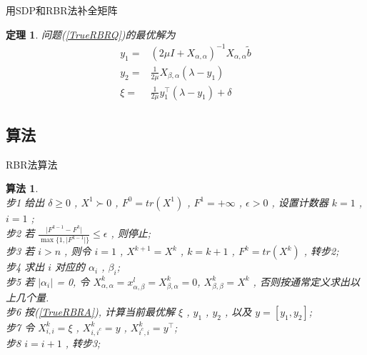 \documentclass[slidestop,compress,mathserif,UTF8]{beamer}
\newtheorem{theo}{\bf \textcolor[rgb]{0.8,0,0}{定理}}[section]  %
\newtheorem{algo}{\bf \textcolor[rgb]{0.8,0,0}{算法}}
\numberwithin{equation}{section}                                %
\begin{document}
            \begin{frame}[t]{用SDP和RBR法补全矩阵}
                \begin{theo}
                    问题(\ref{TrueRBRQ})的最优解为
                    \begin{equation}
                        \begin{split}\label{TrueRBRA}
                            y_1 = & (2 \mu I + X_{\alpha, \alpha})^{-1} X_{\alpha, \alpha}\tilde{b}\\
                            y_2 = & \frac{1}{2 \mu} X_{\beta, \alpha} (\lambda - y_1)\\
                            \xi = & \frac{1}{2 \mu} y_1^\top (\lambda - y_1) + \delta
                        \end{split}
                    \end{equation}
                \end{theo}
            \end{frame}
        \subsection{算法}
            \begin{frame}[t]{RBR法算法}
                \begin{algo}
                    \small\quad\\
                    步1 \quad 给出 $\delta \ge 0$ , $X^1 \succ 0$ , $F^0 = tr(X^1)$ , $F^1 = + \infty$ , $\epsilon > 0$ , 设置计数器 $k = 1$ , $i = 1$ ;\\
                    步2 \quad 若 $\frac{\lvert{F^{k - 1}-F^k}\rvert}{\max\{1,\lvert{F^{k - 1}}\rvert\}}\leq\epsilon$ , 则停止;\\
                    步3 \quad 若 $i>n$ , 则令 $i=1$ , $X^{k + 1}=X^k$ , $k=k + 1$ , $F^k = tr(X^k)$ , 转步2;\\
                    步4 \quad 求出 $i$ 对应的 $\alpha_i$ , $\beta_i$;\\
                    步5 \quad 若 $\vert{\alpha_i}\vert$ = 0, 令 $X^k_{\alpha, \alpha} = x^l_{\alpha, \beta} = X^k_{\beta, \alpha} = 0$, $X^k_{\beta, \beta} = X^k$ , 否则按通常定义求出以上几个量.\\
                    步6 \quad 按(\ref{TrueRBRA}), 计算当前最优解 $\xi$ , $y_1$ , $y_2$ , 以及 $y = [y_1, y_2]$;\\
                    步7 \quad 令 $X^{k}_{i, i} = \xi$ , $X^{k}_{i, i^c} = y$ , $X^{k}_{i^c, i} = y^\top$;\\
                    步8 \quad $i = i + 1$ , 转步3;\normalsize
                \end{algo}
            \end{frame}
\end{document}
